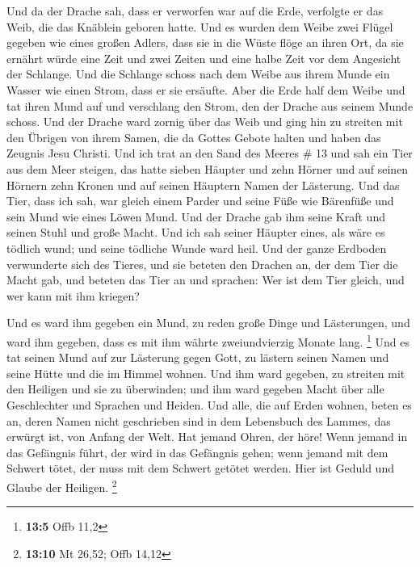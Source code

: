  Und da der Drache sah, dass er verworfen war auf die
Erde, verfolgte er das Weib, die das Knäblein geboren hatte.
 Und es wurden dem Weibe zwei Flügel gegeben wie eines
großen Adlers, dass sie in die Wüste flöge an ihren Ort, da sie ernährt
würde eine Zeit und zwei Zeiten und eine halbe Zeit vor dem Angesicht
der Schlange.  Und die Schlange schoss nach dem Weibe aus
ihrem Munde ein Wasser wie einen Strom, dass er sie ersäufte.
 Aber die Erde half dem Weibe und tat ihren Mund auf und
verschlang den Strom, den der Drache aus seinem Munde schoss.
 Und der Drache ward zornig über das Weib und ging hin zu
streiten mit den Übrigen von ihrem Samen, die da Gottes Gebote halten
und haben das Zeugnis Jesu Christi.  Und ich trat an den
Sand des Meeres \# 13  und sah ein Tier aus dem Meer
steigen, das hatte sieben Häupter und zehn Hörner und auf seinen Hörnern
zehn Kronen und auf seinen Häuptern Namen der Lästerung. 
Und das Tier, dass ich sah, war gleich einem Parder und seine Füße wie
Bärenfüße und sein Mund wie eines Löwen Mund. Und der Drache gab ihm
seine Kraft und seinen Stuhl und große Macht.  Und ich sah
seiner Häupter eines, als wäre es tödlich wund; und seine tödliche Wunde
ward heil. Und der ganze Erdboden verwunderte sich des Tieres,
 und sie beteten den Drachen an, der dem Tier die Macht
gab, und beteten das Tier an und sprachen: Wer ist dem Tier gleich, und
wer kann mit ihm kriegen?

 Und es ward ihm gegeben ein Mund, zu reden große Dinge
und Lästerungen, und ward ihm gegeben, dass es mit ihm währte
zweiundvierzig Monate lang. \footnote{\textbf{13:5} Offb 11,2}
 Und es tat seinen Mund auf zur Lästerung gegen Gott, zu
lästern seinen Namen und seine Hütte und die im Himmel wohnen.
 Und ihm ward gegeben, zu streiten mit den Heiligen und
sie zu überwinden; und ihm ward gegeben Macht über alle Geschlechter und
Sprachen und Heiden.  Und alle, die auf Erden wohnen,
beten es an, deren Namen nicht geschrieben sind in dem Lebensbuch des
Lammes, das erwürgt ist, von Anfang der Welt.  Hat jemand
Ohren, der höre!  Wenn jemand in das Gefängnis führt, der
wird in das Gefängnis gehen; wenn jemand mit dem Schwert tötet, der muss
mit dem Schwert getötet werden. Hier ist Geduld und Glaube der Heiligen.
\footnote{\textbf{13:10} Mt 26,52; Offb 14,12}

